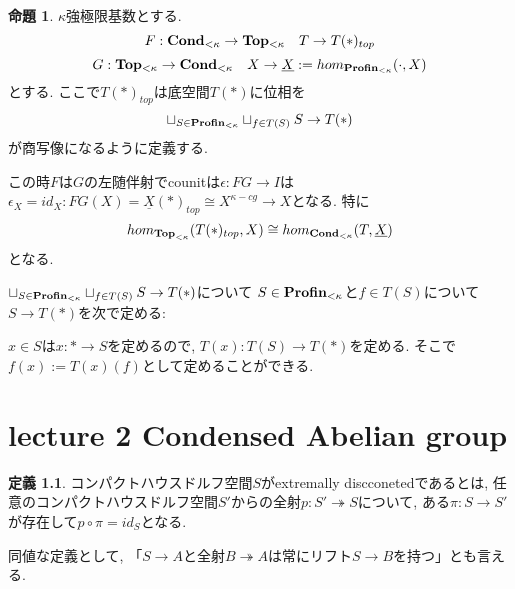 \documentclass[dvipdfmx,a4paper,11pt]{report}
\theoremstyle{definition}
\newtheorem{prop}[thm]{命題}
\newtheorem{dfn}[thm]{定義}
\newcommand{\xr}[1]{\textcolor{red}{#1}}
\begin{document}
  \begin{tcolorbox}
 [colback = white, colframe = green!35!black, fonttitle = \bfseries,breakable = true]
\begin{prop}\cite[proposition 1.7]{Sch19}
$\kappa$強極限基数とする. 
$$
F : {\bf Cond}_{< \kappa} \to {\bf Top_{<\kappa}} \quad T \to T(\ast)_{top}
$$
$$
G :  {\bf Top_{<\kappa}} \to {\bf Cond}_{< \kappa} \quad X \to \underline{X}:=hom_{{\bf Profin}_{<\kappa}}(\cdot, X)
$$
とする. 
ここで$T(\ast)_{top}$は底空間$T(\ast)$に位相を
$$
\sqcup_{S \in {\bf Profin}_{<\kappa}}  \sqcup_{f \in T(S) }  S \to T(\ast)
$$
が商写像になるように定義する.

この時$F$は$G$の左随伴射でcounitは$\epsilon : FG \to I$は$\epsilon_{X}=id_{X}: FG(X)=\underline{X}(\ast)_{top}\cong X^{\kappa-cg} \to X$となる. 
特に
$$
hom_{{\bf Top}_{<\kappa}}(T(\ast)_{top}, X) \cong hom_{{\bf Cond}_{<\kappa}}(T, \underline{X})
$$
となる. 
 \end{prop}
 \end{tcolorbox}

$\sqcup_{S \in {\bf Profin}_{<\kappa}}  \sqcup_{f \in T(S) }  S \to T(\ast)$について
$S \in {\bf Profin}_{<\kappa}$と$f \in T(S)$について$S \to T(\ast)$を次で定める:

$x \in S$は$x : \ast \to S$を定めるので, 
$T(x) : T(S) \to T(\ast)$を定める.
そこで$f(x):=T(x)(f)$として定めることができる. 





\chapter{lecture 2 Condensed Abelian group}

  \begin{tcolorbox}
 [colback = white, colframe = green!35!black, fonttitle = \bfseries,breakable = true]
\begin{dfn}\cite[Definition 2.4]{Sch19}
コンパクトハウスドルフ空間$S$がextremally discconetedであるとは, 任意のコンパクトハウスドルフ空間$S'$からの全射$ p : S '  \twoheadrightarrow S$について, ある$\pi : S \to S'$が存在して$p \circ \pi = id_{S}$となる. 
 \end{dfn}
 \end{tcolorbox}
 
 同値な定義として, 「$S \to A$と全射$B \twoheadrightarrow A$は常にリフト$S \to B$を持つ」とも言える. 
 
\end{document}

